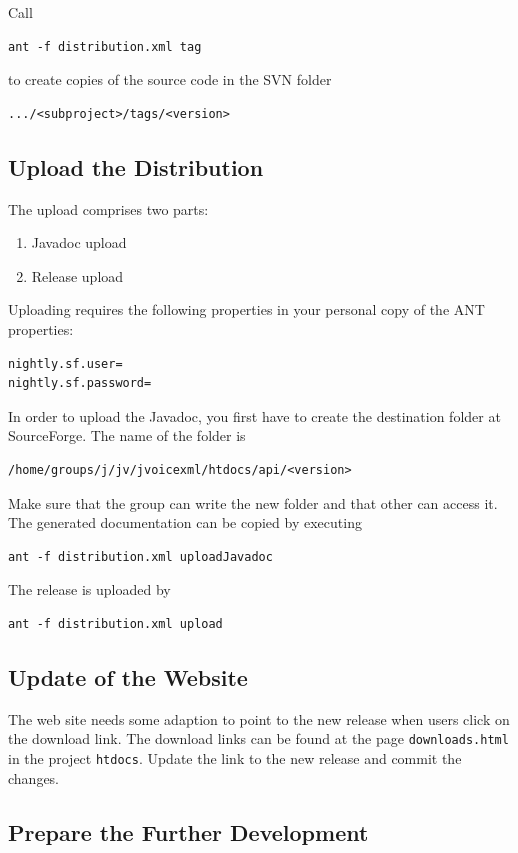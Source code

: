 \documentclass[11pt,a4paper]{article}
\begin{document}
Call
\begin{lstlisting}
ant -f distribution.xml tag
\end{lstlisting}
to create copies of the source code in the SVN folder
\begin{lstlisting}
.../<subproject>/tags/<version>
\end{lstlisting}

\subsection{Upload the Distribution}

The upload comprises two parts:
\begin{enumerate}
  \item Javadoc upload
  \item Release upload
\end{enumerate}

Uploading requires the following properties in your personal copy of the ANT
properties:
\begin{lstlisting}
nightly.sf.user=
nightly.sf.password=
\end{lstlisting}

In order to upload the Javadoc, you first have to create the
destination folder at SourceForge. The name of the folder is
\begin{lstlisting}
/home/groups/j/jv/jvoicexml/htdocs/api/<version>
\end{lstlisting}
Make sure that the group can write the new folder and that other can access it.
The generated documentation can be copied by executing
\begin{lstlisting}
ant -f distribution.xml uploadJavadoc
\end{lstlisting}

The release is uploaded by 
\begin{lstlisting}
ant -f distribution.xml upload
\end{lstlisting}

\subsection{Update of the Website}

The web site needs some adaption to point to the new release when users click
on the download link. The download links can be found at the page
\texttt{downloads.html} in the project \texttt{htdocs}. Update the link
to the new release and commit the changes.

\subsection{Prepare the Further Development}
\end{document}
